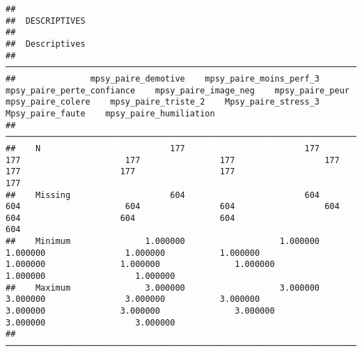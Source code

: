\documentclass[
]{article}
\begin{document}
\begin{verbatim}
## 
##  DESCRIPTIVES
## 
##  Descriptives                                                                                                                                                                                                                                            
##  ─────────────────────────────────────────────────────────────────────────────────────────────────────────────────────────────────────────────────────────────────────────────────────────────────────────────────────────────────────────────────────── 
##               mpsy_paire_demotive    mpsy_paire_moins_perf_3    mpsy_paire_perte_confiance    mpsy_paire_image_neg    mpsy_paire_peur    mpsy_paire_colere    mpsy_paire_triste_2    Mpsy_paire_stress_3    Mpsy_paire_faute    mpsy_paire_humiliation   
##  ─────────────────────────────────────────────────────────────────────────────────────────────────────────────────────────────────────────────────────────────────────────────────────────────────────────────────────────────────────────────────────── 
##    N                          177                        177                           177                     177                177                  177                    177                    177                 177                       177   
##    Missing                    604                        604                           604                     604                604                  604                    604                    604                 604                       604   
##    Minimum               1.000000                   1.000000                      1.000000                1.000000           1.000000             1.000000               1.000000               1.000000            1.000000                  1.000000   
##    Maximum               3.000000                   3.000000                      3.000000                3.000000           3.000000             3.000000               3.000000               3.000000            3.000000                  3.000000   
##  ───────────────────────────────────────────────────────────────────────────────────────────────────────────────────────────────────────────────────────────────────────────────────────────────────────────────────────────────────────────────────────
\end{verbatim}
\end{document}
